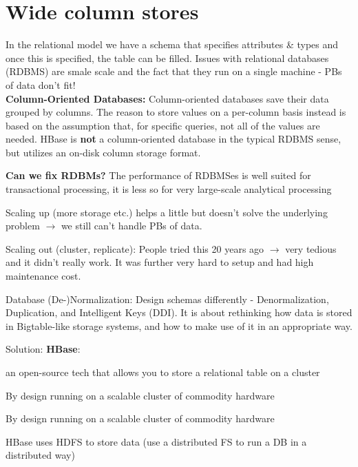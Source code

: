 \documentclass[11pt,oneside,a4paper]{article}
\begin{document}
\newpage

\section{Wide column stores}

In the relational model we have a schema that specifies attributes \& types and once this is specified, the table can be filled. Issues with relational databases (RDBMS) are smale scale and the fact that they run on a single machine - PBs of data don't fit!\\
\textbf{Column-Oriented Databases:} Column-oriented databases save their data grouped by columns. The reason to store values on a per-column basis instead is based on the assumption that, for specific queries, not all of the values are needed. HBase is \textbf{not} a column-oriented database in the typical RDBMS sense, but utilizes an on-disk column storage format.


\textbf{Can we fix RDBMs?}
The performance of RDBMSes is well suited for transactional processing, it is less so for very large-scale analytical processing

\begin{compactitem}
	\item Scaling up (more storage etc.) helps a little but doesn't solve the underlying problem $\rightarrow$ we still can't handle PBs of data.
	\item Scaling out (cluster, replicate): People tried this 20 years ago $\rightarrow$ very tedious and it didn't really work. It was further very hard to setup and had high maintenance cost.
\end{compactitem}

Database (De-)Normalization: Design schemas differently - Denormalization, Duplication, and Intelligent Keys (DDI). It is about rethinking how data is stored in Bigtable-like storage systems, and how to make use of it in an appropriate way.

Solution: \textbf{HBase}:

\begin{compactitem}
	\item an open-source tech that allows you to store a relational table on a cluster
	\item By design running on a scalable cluster of commodity hardware
	\item By design running on a scalable cluster of commodity hardware
	\item HBase uses HDFS to store data (use a distributed FS to run a DB in a distributed way)
\end{compactitem}
\end{document}
